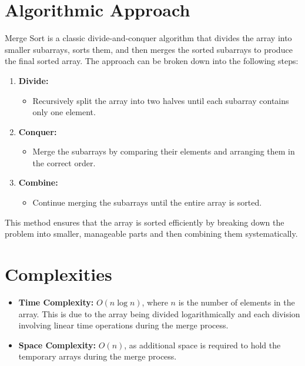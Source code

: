 \section*{Algorithmic Approach}
Merge Sort is a classic divide-and-conquer algorithm that divides the array into smaller subarrays, sorts them, and then merges the sorted subarrays to produce the final sorted array. The approach can be broken down into the following steps:

\begin{enumerate}
    \item \textbf{Divide:}
    \begin{itemize}
        \item Recursively split the array into two halves until each subarray contains only one element.
    \end{itemize}
    
    \item \textbf{Conquer:}
    \begin{itemize}
        \item Merge the subarrays by comparing their elements and arranging them in the correct order.
    \end{itemize}
    
    \item \textbf{Combine:}
    \begin{itemize}
        \item Continue merging the subarrays until the entire array is sorted.
    \end{itemize}
\end{enumerate}

This method ensures that the array is sorted efficiently by breaking down the problem into smaller, manageable parts and then combining them systematically.


\section*{Complexities}

\begin{itemize}
    \item \textbf{Time Complexity:} \(O(n \log n)\), where \(n\) is the number of elements in the array. This is due to the array being divided logarithmically and each division involving linear time operations during the merge process.
    \item \textbf{Space Complexity:} \(O(n)\), as additional space is required to hold the temporary arrays during the merge process.
\end{itemize}

